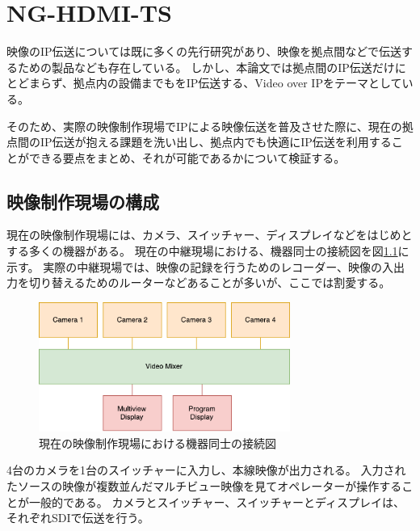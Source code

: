 \chapter{NG-HDMI-TS}
\label{chap:network-transmission}

映像のIP伝送については既に多くの先行研究があり、映像を拠点間などで伝送するための製品なども存在している。
しかし、本論文では拠点間のIP伝送だけにとどまらず、拠点内の設備までもをIP伝送する、Video over IPをテーマとしている。

そのため、実際の映像制作現場でIPによる映像伝送を普及させた際に、現在の拠点間のIP伝送が抱える課題を洗い出し、拠点内でも快適にIP伝送を利用することができる要点をまとめ、それが可能であるかについて検証する。

\section{映像制作現場の構成}

現在の映像制作現場には、カメラ、スイッチャー、ディスプレイなどをはじめとする多くの機器がある。
現在の中継現場における、機器同士の接続図を図\ref{fig:broadcast-diagram-on-sdi}に示す。
実際の中継現場では、映像の記録を行うためのレコーダー、映像の入出力を切り替えるためのルーターなどあることが多いが、ここでは割愛する。

\begin{figure}[htbp]
  \begin{center}
    \includegraphics[bb=0 0 432 222,width=8.233cm]{img/broadcast-diagram-on-sdi.pdf}
  \end{center}
  \caption{現在の映像制作現場における機器同士の接続図}
  \label{fig:broadcast-diagram-on-sdi}
\end{figure}

4台のカメラを1台のスイッチャーに入力し、本線映像が出力される。
入力されたソースの映像が複数並んだマルチビュー映像を見てオペレーターが操作することが一般的である。
カメラとスイッチャー、スイッチャーとディスプレイは、それぞれSDIで伝送を行う。


